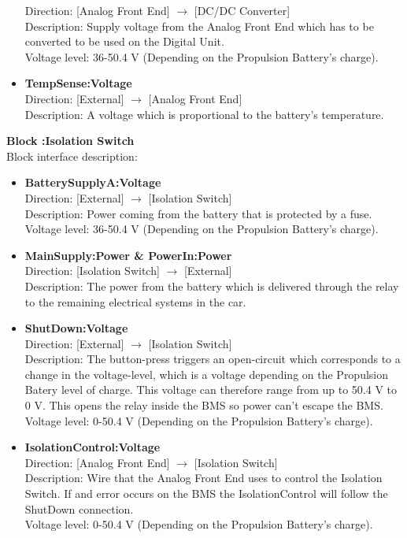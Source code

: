 \begin{itemize}
	Direction: [Analog Front End] $\rightarrow$ [DC/DC Converter]\\
	Description: Supply voltage from the Analog Front End which has to be converted to be used on the Digital Unit.\\
	Voltage level: 36-50.4 V (Depending on the Propulsion Battery's charge).
	\item \textbf{TempSense:Voltage}\\
	Direction: [External] $\rightarrow$ [Analog Front End]\\
	Description: A voltage which is proportional to the battery's temperature.
\end{itemize}

\textbf{Block :Isolation Switch}\\
Block interface description:
\begin{itemize}
	\item \textbf{BatterySupplyA:Voltage}\\
	Direction: [External] $\rightarrow$ [Isolation Switch]\\
	Description: Power coming from the battery that is protected by a fuse.\\
	Voltage level: 36-50.4 V (Depending on the Propulsion Battery's charge).
	\item \textbf{MainSupply:Power \& PowerIn:Power}\\
	Direction: [Isolation Switch] $\rightarrow$ [External]\\
	Description: The power from the battery which is delivered through the relay to the remaining electrical systems in the car. 
	\item \textbf{ShutDown:Voltage}\\
	Direction: [External] $\rightarrow$ [Isolation Switch]\\
	Description: The button-press triggers an open-circuit which corresponds to a change in the voltage-level, which is a voltage depending on the Propulsion Batery level of charge. This voltage can therefore range from up to 50.4 V to 0 V. This opens the relay inside the BMS so power can't escape the BMS.\\
	Voltage level: 0-50.4 V (Depending on the Propulsion Battery's charge).
	\item \textbf{IsolationControl:Voltage}\\
	Direction: [Analog Front End] $\rightarrow$ [Isolation Switch]\\
	Description: Wire that the Analog Front End uses to control the Isolation Switch. If and error occurs on the BMS the IsolationControl will follow the ShutDown connection.  \\
	Voltage level: 0-50.4 V (Depending on the Propulsion Battery's charge).
\end{itemize}


